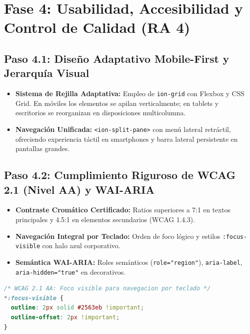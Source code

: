 \documentclass[11pt,a4paper]{article}
\begin{document}
\section{Fase 4: Usabilidad, Accesibilidad y Control de Calidad (RA 4)}
\label{sec:fase4}

\subsection{Paso 4.1: Diseño Adaptativo Mobile-First y Jerarquía Visual}
\begin{itemize}[leftmargin=*]
    \item \textbf{Sistema de Rejilla Adaptativa:} Empleo de \texttt{ion-grid} con Flexbox y CSS Grid. En móviles los elementos se apilan verticalmente; en tablets y escritorios se reorganizan en disposiciones multicolumna.
    \item \textbf{Navegación Unificada:} \texttt{<ion-split-pane>} con menú lateral retráctil, ofreciendo experiencia táctil en smartphones y barra lateral persistente en pantallas grandes.
\end{itemize}

\subsection{Paso 4.2: Cumplimiento Riguroso de WCAG 2.1 (Nivel AA) y WAI-ARIA}
\begin{itemize}[leftmargin=*]
    \item \textbf{Contraste Cromático Certificado:} Ratios superiores a 7:1 en textos principales y 4.5:1 en elementos secundarios (WCAG 1.4.3).
    \item \textbf{Navegación Integral por Teclado:} Orden de foco lógico y estilos \texttt{:focus-visible} con halo azul corporativo.
    \item \textbf{Semántica WAI-ARIA:} Roles semánticos (\texttt{role="region"}), \texttt{aria-label}, \texttt{aria-hidden="true"} en decorativos.
\end{itemize}

\begin{lstlisting}[language=CSS, caption={Foco visible WCAG en admin-dashboard.page.scss}]
/* WCAG 2.1 AA: Foco visible para navegacion por teclado */
*:focus-visible {
  outline: 2px solid #2563eb !important;
  outline-offset: 2px !important;
}
\end{lstlisting}
\end{document}
